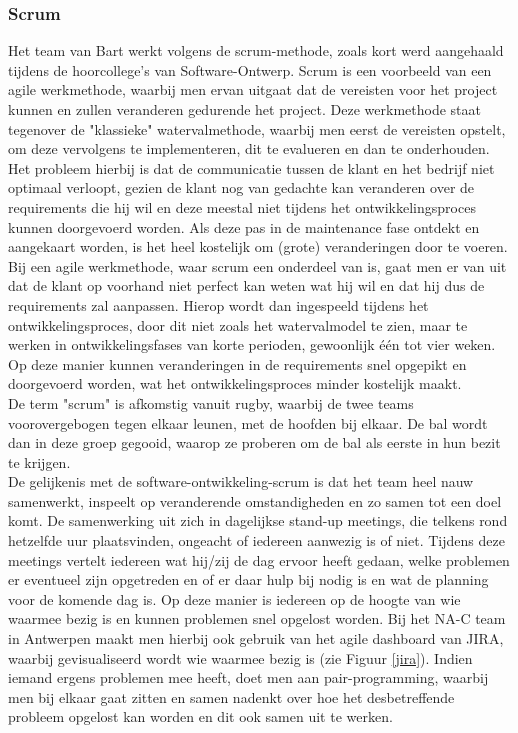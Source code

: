 \documentclass[10pt,a4paper]{article}
\begin{document}
\subsubsection{Scrum}
Het team van Bart werkt volgens de scrum-methode, zoals kort werd aangehaald tijdens de hoorcollege's van Software-Ontwerp. Scrum is een voorbeeld van een agile werkmethode, waarbij men ervan uitgaat dat de vereisten voor het project kunnen en zullen veranderen gedurende het project. Deze werkmethode staat tegenover de "klassieke" watervalmethode, waarbij men eerst de vereisten opstelt, om deze vervolgens te implementeren, dit te evalueren en dan te onderhouden. Het probleem hierbij is dat de communicatie tussen de klant en het bedrijf niet optimaal verloopt, gezien de klant nog van gedachte kan veranderen over de requirements die hij wil en deze meestal niet tijdens het ontwikkelingsproces kunnen doorgevoerd worden. Als deze pas in de maintenance fase ontdekt en aangekaart worden, is het heel kostelijk om (grote) veranderingen door te voeren.\\
Bij een agile werkmethode, waar scrum een onderdeel van is, gaat men er van uit dat de klant op voorhand niet perfect kan weten wat hij wil en dat hij dus de requirements zal aanpassen. Hierop wordt dan ingespeeld tijdens het ontwikkelingsproces, door dit niet zoals het watervalmodel te zien, maar te werken in ontwikkelingsfases van korte perioden, gewoonlijk \'e\'en tot vier weken. Op deze manier kunnen veranderingen in de requirements snel opgepikt en doorgevoerd worden, wat het ontwikkelingsproces minder kostelijk maakt.\\
De term "scrum" is afkomstig vanuit rugby, waarbij de twee teams voorovergebogen tegen elkaar leunen, met de hoofden bij elkaar. De bal wordt dan in deze groep gegooid, waarop ze proberen om de bal als eerste in hun bezit te krijgen.\\
De gelijkenis met de software-ontwikkeling-scrum is dat het team heel nauw samenwerkt, inspeelt op veranderende omstandigheden en zo samen tot een doel komt. De samenwerking uit zich in dagelijkse stand-up meetings, die telkens rond hetzelfde uur plaatsvinden, ongeacht of iedereen aanwezig is of niet. Tijdens deze meetings vertelt iedereen wat hij/zij de dag ervoor heeft gedaan, welke problemen er eventueel zijn opgetreden en of er daar hulp bij nodig is en wat de planning voor de komende dag is. Op deze manier is iedereen op de hoogte van wie waarmee bezig is en kunnen problemen snel opgelost worden. Bij het NA-C team in Antwerpen maakt men hierbij ook gebruik van het agile dashboard van JIRA, waarbij gevisualiseerd wordt wie waarmee bezig is (zie Figuur \ref{jira}). Indien iemand ergens problemen mee heeft, doet men aan pair-programming, waarbij men bij elkaar gaat zitten en samen nadenkt over hoe het desbetreffende probleem opgelost kan worden en dit ook samen uit te werken.\\
\end{document}
